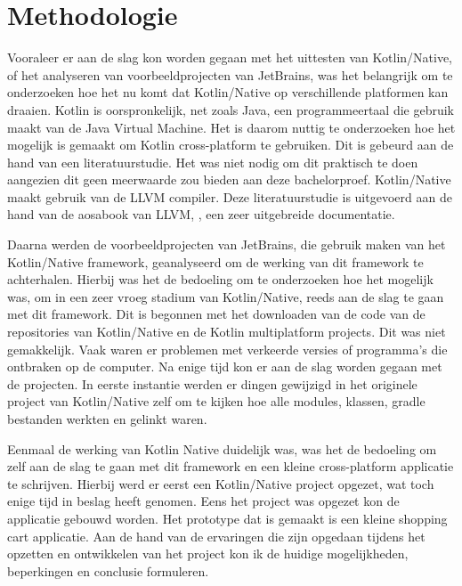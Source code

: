
\chapter{Methodologie}
\label{ch:methodologie}


Vooraleer er aan de slag kon worden gegaan met het uittesten van Kotlin/Native, of het analyseren van voorbeeldprojecten van JetBrains, was het belangrijk om te onderzoeken hoe het nu komt dat Kotlin/Native op verschillende platformen kan draaien. Kotlin is oorspronkelijk, net zoals Java, een programmeertaal die gebruik maakt van de Java Virtual Machine. Het is daarom nuttig te onderzoeken hoe het mogelijk is gemaakt om Kotlin cross-platform te gebruiken. Dit is gebeurd aan de hand van een literatuurstudie. Het was niet nodig om dit praktisch te doen aangezien dit geen meerwaarde zou bieden aan deze bachelorproef. Kotlin/Native maakt gebruik van de LLVM compiler. Deze literatuurstudie is uitgevoerd aan de hand van de aosabook van LLVM, \textcite{aosa}, een zeer uitgebreide documentatie. 

Daarna werden de voorbeeldprojecten van JetBrains, die gebruik maken van het Kotlin/Native framework, geanalyseerd om de werking van dit framework te achterhalen. Hierbij was het de bedoeling om te onderzoeken hoe het mogelijk was, om in een zeer vroeg stadium van Kotlin/Native, reeds aan de slag te gaan met dit framework. Dit is begonnen met het downloaden van de code van de repositories van Kotlin/Native en de Kotlin multiplatform projects. Dit was niet gemakkelijk. Vaak waren er problemen met verkeerde versies of programma's die ontbraken op de computer. Na enige tijd kon er aan de slag worden gegaan met de projecten. In eerste instantie werden er dingen gewijzigd in het originele project van Kotlin/Native zelf om te kijken hoe alle modules, klassen, gradle bestanden werkten en gelinkt waren.

Eenmaal de werking van Kotlin Native duidelijk was, was het de bedoeling om zelf aan de slag te gaan met dit framework en een kleine cross-platform applicatie te schrijven. Hierbij werd er eerst een Kotlin/Native project opgezet, wat toch enige tijd in beslag heeft genomen. Eens het project was opgezet kon de applicatie gebouwd worden. Het prototype dat is gemaakt is een kleine shopping cart applicatie. Aan de hand van de ervaringen die zijn opgedaan tijdens het opzetten en ontwikkelen van het project kon ik de huidige mogelijkheden, beperkingen en conclusie formuleren.

